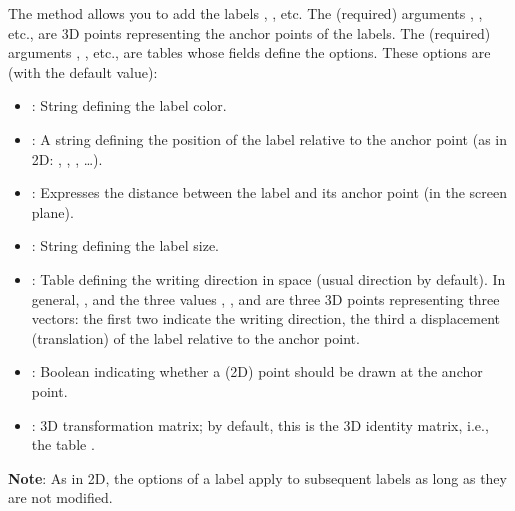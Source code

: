 The  method allows you to add the labels , , etc. The (required) arguments , , etc., are 3D points representing the anchor points of the labels. The (required) arguments , , etc., are tables whose fields define the options. These options are (with the default value):
\begin{itemize}
    \item {}: String defining the label color.
    \item {}: A string defining the position of the label relative to the anchor point (as in 2D: , , , \ldots).
    \item {}: Expresses the distance between the label and its anchor point (in the screen plane).
    \item {}: String defining the label size.
    \item {}: Table defining the writing direction in space (usual direction by default).
In general, , and the three values ​​, , and  are three 3D points representing three vectors: the first two indicate the writing direction, the third a displacement (translation) of the label relative to the anchor point.
    \item {}: Boolean indicating whether a (2D) point should be drawn at the anchor point.
    \item {}: 3D transformation matrix; by default, this is the 3D identity matrix, i.e., the table .
\end{itemize}

\textbf{Note}: As in 2D, the options of a label apply to subsequent labels as long as they are not modified.

